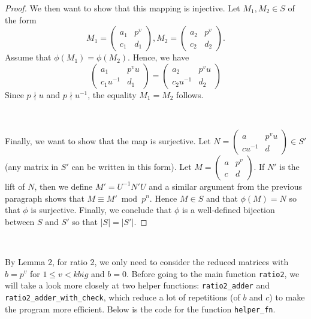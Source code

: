 \documentclass[letterpaper,12pt]{article}
\begin{document}
\begin{proof}
We then want to show that this mapping is injective.
Let $M_1, M_2 \in S$ of the form 
\[
M_1 = \begin{pmatrix}
a_1 & p^v \\ c_1 & d_1
\end{pmatrix}, 
M_2 = \begin{pmatrix}
a_2 & p^v \\ c_2 & d_2
\end{pmatrix}.
\]
Assume that $\phi(M_1) = \phi(M_2)$.
Hence, we have 
\[
\begin{pmatrix}
a_1 & p^v u \\ c_1u^{-1} & d_1
\end{pmatrix} = \begin{pmatrix}
a_2 & p^v u \\ c_2u^{-1} & d_2
\end{pmatrix}
\]  
Since $p \nmid u$ and $p \nmid u^{-1}$, the equality $M_1 = M_2$ follows.

\

Finally, we want to show that the map is surjective.
Let $N = \begin{pmatrix}
a & p^v u \\ cu^{-1} & d
\end{pmatrix} \in S'$ (any matrix in $S'$ can be written in this form).
Let $M = \begin{pmatrix}
a & p^v \\ c & d
\end{pmatrix}$.
If $N'$ is the lift of $N$, then we define 
$M' = U^{-1}N'U$ and a similar argument from the previous paragraph 
shows that $M \equiv M' \bmod   p^n$.
Hence $M \in S$ and that $\phi(M) = N$ 
so that $\phi$ is surjective.
Finally, we conclude that $\phi$ is a well-defined bijection 
between $S$ and $S'$ so that $|S| = |S'|$.
\end{proof}


\

By Lemma 2, for ratio 2, we only need to 
consider the reduced matrices with $b = p^v$ for $1 \leq v < kbig$ and $b = 0$.
Before going to the main function \texttt{ratio2}, we will take a look more closely 
at two helper functions: \texttt{ratio2\_adder} and \texttt{ratio2\_adder\_with\_check},
which reduce a lot of repetitions (of $b$ and $c$) to make the program more efficient.
Below is the code for the function \texttt{helper\_fn}.
\end{document}
